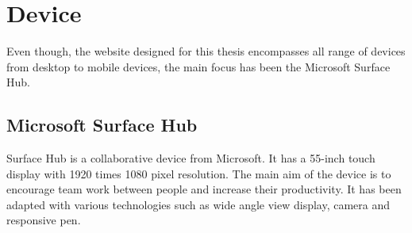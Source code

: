 \chapter{Device}
Even though, the website designed for this thesis encompasses all range of devices from desktop to mobile devices, the main focus has been the Microsoft Surface Hub.

\section{Microsoft Surface Hub}
Surface Hub is a collaborative device from Microsoft. It has a 55-inch touch display with 1920 times 1080 pixel resolution. The main aim of the device is to encourage team work between people and increase their productivity. It has been adapted with various technologies such as wide angle view display, camera and responsive pen. 